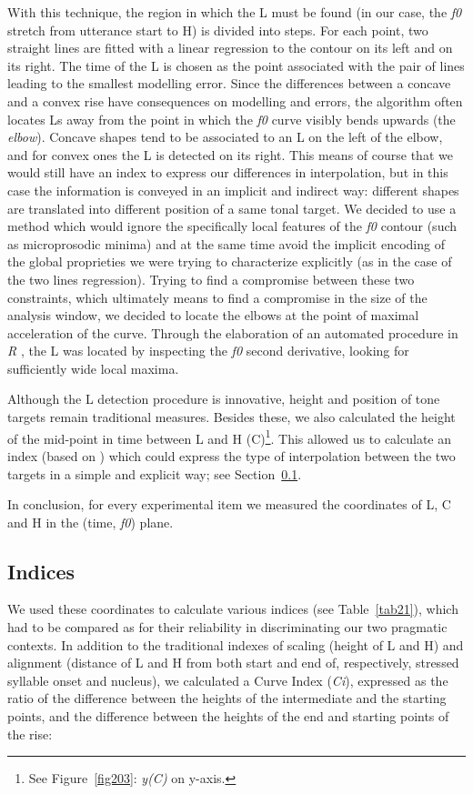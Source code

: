 With this technique, the region in which the L must be found (in our case, the \textit{f0} stretch from utterance start to H) is divided into steps. For each point, two straight lines are fitted with a linear regression to the contour on its left and on its right. The time of the L is chosen as the point associated with the pair of lines leading to the smallest modelling error. Since the differences between a concave and a convex rise have consequences on modelling and errors, the algorithm often locates Ls away from the point in which the \textit{f0} curve visibly bends upwards (the \textit{elbow}). Concave shapes tend to be associated to an L on the left of the elbow, and for convex ones the L is detected on its right. This means of course that we would still have an index to express our differences in interpolation, but in this case the information is conveyed in an implicit and indirect way: different shapes are translated into different position of a same tonal target.
We decided to use a method which would ignore the specifically local features of the \textit{f0} contour (such as microprosodic minima) and at the same time avoid the implicit encoding of the global proprieties we were trying to characterize explicitly (as in the case of the two lines regression). Trying to find a compromise between these two constraints, which ultimately means to find a compromise in the size of the analysis window, we decided to locate the elbows at the point of maximal acceleration of the curve. Through the elaboration of an automated procedure in \textit{R} \citep{r2008r}, the L was located by inspecting the \textit{f0} second derivative, looking for sufficiently wide local maxima.

Although the L detection procedure is innovative, height and position of tone targets remain traditional measures. Besides these, we also calculated the height of the mid-point in time between L and H (C)\footnote{See Figure~\ref{fig203}: \textit{y(C)} on y-axis.}. This allowed us to calculate an index (based on \citealt{dombrowski2005acoustic}) which could express the type of interpolation between the two targets in a simple and explicit way; see Section~\ref{sec223}.

In conclusion, for every experimental item we measured the coordinates of L, C and H in the (time, \textit{f0}) plane.

\subsection{Indices}\label{sec223}
We used these coordinates to calculate various indices (see Table~\ref{tab21}), which had to be compared as for their reliability in discriminating our two pragmatic contexts. In addition to the traditional indexes of scaling (height of L and H) and alignment (distance of L and H from both start and end of, respectively, stressed syllable onset and nucleus), we calculated a Curve Index (\textit{Ci}), expressed as the ratio of the difference between the heights of the intermediate and the starting points, and the difference between the heights of the end and starting points of the rise:


